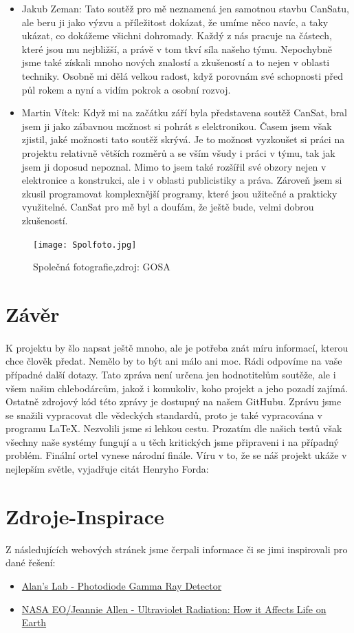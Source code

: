 \documentclass[a4paper]{report}
\begin{document}
\begin{itemize}
\item Jakub Zeman: Tato soutěž pro mě neznamená jen samotnou stavbu CanSatu, ale beru ji jako výzvu a příležitost dokázat, že umíme něco navíc, a taky ukázat, co dokážeme všichni dohromady. Každý z nás pracuje na částech, které jsou mu nejbližší, a právě v tom tkví síla našeho týmu. Nepochybně jsme také získali mnoho nových znalostí a zkušeností a to nejen v oblasti techniky.
Osobně mi dělá velkou radost, když porovnám své schopnosti před půl rokem a nyní a vidím pokrok a osobní rozvoj.
\item Martin Vítek: Když mi na začátku září byla představena soutěž CanSat, bral jsem ji jako zábavnou možnost si pohrát s elektronikou. Časem jsem však zjistil, jaké možnosti tato soutěž skrývá. Je to možnost vyzkoušet si práci na projektu relativně větších rozměrů a se vším všudy i práci v týmu, tak jak jsem ji doposud nepoznal. Mimo to jsem také rozšířil své obzory nejen v elektronice a konstrukci, ale i v oblasti publicistiky a práva. Zároveň jsem si zkusil programovat komplexnější programy, které jsou užitečné a prakticky využitelné. CanSat pro mě byl a doufám, že ještě bude, velmi dobrou zkušeností.
\end{itemize}
\begin{figure}[!h]
\centering
\caption{Společná fotografie,zdroj: GOSA}
\texttt{[image: Spolfoto.jpg]}
\end{figure}
\section{Závěr}
\paragraph{} K projektu by šlo napsat ještě mnoho, ale je potřeba znát míru informací, kterou chce člověk předat. Nemělo by to být ani málo ani moc. Rádi odpovíme na vaše případné další dotazy. Tato zpráva není určena jen hodnotitelům soutěže, ale i všem našim chlebodárcům, jakož i komukoliv, koho projekt a jeho pozadí zajímá. Ostatně zdrojový kód této zprávy je dostupný na našem GitHubu. Zprávu jsme se snažili vypracovat dle vědeckých standardů, proto je také vypracována v programu \LaTeX. Nezvolili jsme si lehkou cestu. Prozatím dle našich testů však všechny naše systémy fungují a u těch kritických jsme připraveni i na případný problém. Finální ortel vynese národní finále. Víru v to, že se náš projekt ukáže v nejlepším světle, vyjadřuje citát Henryho Forda: 
\section{Zdroje-Inspirace}
Z následujících webových stránek jsme čerpali informace či se jimi inspirovali pro dané řešení:
\begin{itemize}
\item\href{http://www.vk2zay.net/article/265}{Alan's Lab - Photodiode Gamma Ray Detector}
\item\href{https://earthobservatory.nasa.gov/Features/UVB/}{NASA EO/Jeannie Allen - 	
Ultraviolet Radiation: How it Affects Life on Earth}
\end{itemize}
\listoffigures
\end{document}
